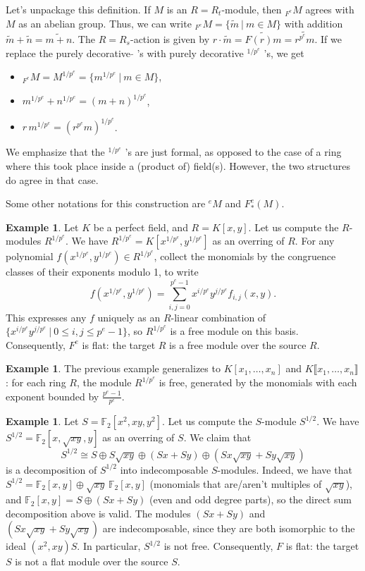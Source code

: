 \documentclass[11pt]{book}
\numberwithin{equation}{section}
\numberwithin{theorem}{chapter}
\theoremstyle{definition}
\newtheorem{example}[theorem]{Example}
\newtheorem*{basic properties}{Basic Properties}
\newtheorem*{Important Remark}{Important Remark}
\theoremstyle{remark}
\newcommand{\FF}{\mathbb{F}}
\begin{document}
Let's unpackage this definition. If $M$ is an $R=R_t$-module, then ${}_{F^e} M$ agrees with $M$ as an abelian group. Thus, we can write 
${}_{F^e} M = \{ \widetilde{m} \ | \ m\in M\}$ with addition $\widetilde{m}+\widetilde{n}=\widetilde{m+n}$. The $R=R_s$-action is given by $r\cdot \widetilde{m} = \widetilde{F(r)m}=\widetilde{r^{p^e}m}$. If we replace the purely decorative $\widetilde{ }$ 's with purely decorative ${}^{1/p^e}$ 's, we get
\begin{itemize}
\item ${}_{F^e} M = M^{1/p^e} = \{ m^{1/p^e} \ | \ m\in M \}$,
\item $m^{1/p^e} + n^{1/p^e} = (m+n)^{1/p^e}$,
\item $r \, m^{1/p^e} = (r^{p^e} m)^{1/p^e}$.
\end{itemize}
We emphasize that the ${}^{1/p^e}$ 's are just formal, as opposed to the case of a ring where this took place inside a (product of) field(s). However, the two structures do agree in that case.

Some other notations for this construction are ${}^e M$ and $F^e_{*}(M)$.

\begin{example} Let $K$ be a perfect field, and $R=K[ x,y ]$. Let us compute the  $R$-modules $R^{1/p^e}$. We have $R^{1/p^e}=K[x^{1/p^e},y^{1/p^e}]$ as an overring of $R$. For any polynomial $f(x^{1/p^e},y^{1/p^e})\in R^{1/p^e}$, collect the monomials by the congruence classes of their exponents modulo 1, to write
	\[ f(x^{1/p^e},y^{1/p^e})= \sum_{i,j=0}^{p^e-1} x^{i/p^e} y^{j/p^e} f_{i,j}(x,y). \]
This expresses any $f$ uniquely as an $R$-linear combination of $\{ x^{i/p^e} y^{j/p^e} \ | \ 0\leq i,j \leq p^e-1 \}$, so $R^{1/p^e}$ is a free module on this basis. Consequently, $F^e$ is flat: the target $R$ is a free module over the source $R$.
	\end{example}

\begin{example}\label{freebasispolypowerseries}
	The previous example generalizes to $K[x_1,\dots,x_n]$ and $K\llbracket x_1,\dots,x_n\rrbracket$: for each ring $R$, the module $R^{1/p^e}$ is free, generated by the monomials with each exponent bounded by $\frac{p^e-1}{p^e}$.
\end{example}
	
\begin{example} Let $S=\FF_2[ x^2,xy,y^2 ]$. Let us compute the  $S$-module $S^{1/2}$. We have $S^{1/2}=\FF_2[x,\sqrt{xy},y]$ as an overring of $S$. We claim that 
	\[ S^{1/2} \cong S \oplus S\sqrt{xy} \oplus (Sx+ Sy) \oplus (Sx\sqrt{xy} + Sy\sqrt{xy})\]
	is a decomposition of $S^{1/2}$ into indecomposable $S$-modules. Indeed, we have that $S^{1/2}=\FF_2[x,y] \oplus \sqrt{xy} \,\FF_2[x,y]$ (monomials that are/aren't multiples of $\sqrt{xy}$), and $\FF_2[x,y] = S \oplus (Sx+Sy)$ (even and odd degree parts), so the direct sum decomposition above is valid. The modules $(Sx+ Sy)$ and $(Sx\sqrt{xy} + Sy\sqrt{xy})$ are indecomposable, since they are both isomorphic to the ideal $(x^2,xy)S$. In particular, $S^{1/2}$ is not free. Consequently, $F$ is flat: the target $S$ is not a flat module over the source $S$.
\end{example}
\end{document}

